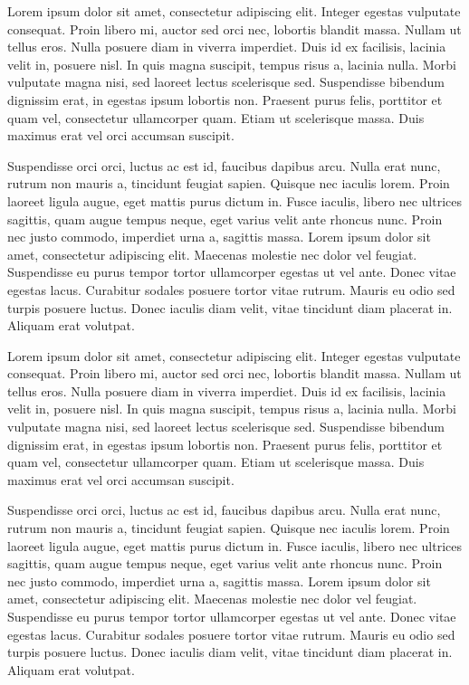 \documentclass[phd]{und-thesis}
\begin{document}



\appendix 


Lorem ipsum dolor sit amet, consectetur adipiscing elit. Integer egestas vulputate consequat. Proin libero mi, auctor sed orci nec, lobortis blandit massa. Nullam ut tellus eros. Nulla posuere diam in viverra imperdiet. Duis id ex facilisis, lacinia velit in, posuere nisl. In quis magna suscipit, tempus risus a, lacinia nulla. Morbi vulputate magna nisi, sed laoreet lectus scelerisque sed. Suspendisse bibendum dignissim erat, in egestas ipsum lobortis non. Praesent purus felis, porttitor et quam vel, consectetur ullamcorper quam. Etiam ut scelerisque massa. Duis maximus erat vel orci accumsan suscipit.

Suspendisse orci orci, luctus ac est id, faucibus dapibus arcu. Nulla erat nunc, rutrum non mauris a, tincidunt feugiat sapien. Quisque nec iaculis lorem. Proin laoreet ligula augue, eget mattis purus dictum in. Fusce iaculis, libero nec ultrices sagittis, quam augue tempus neque, eget varius velit ante rhoncus nunc. Proin nec justo commodo, imperdiet urna a, sagittis massa. Lorem ipsum dolor sit amet, consectetur adipiscing elit. Maecenas molestie nec dolor vel feugiat. Suspendisse eu purus tempor tortor ullamcorper egestas ut vel ante. Donec vitae egestas lacus. Curabitur sodales posuere tortor vitae rutrum. Mauris eu odio sed turpis posuere luctus. Donec iaculis diam velit, vitae tincidunt diam placerat in. Aliquam erat volutpat.


Lorem ipsum dolor sit amet, consectetur adipiscing elit. Integer egestas vulputate consequat. Proin libero mi, auctor sed orci nec, lobortis blandit massa. Nullam ut tellus eros. Nulla posuere diam in viverra imperdiet. Duis id ex facilisis, lacinia velit in, posuere nisl. In quis magna suscipit, tempus risus a, lacinia nulla. Morbi vulputate magna nisi, sed laoreet lectus scelerisque sed. Suspendisse bibendum dignissim erat, in egestas ipsum lobortis non. Praesent purus felis, porttitor et quam vel, consectetur ullamcorper quam. Etiam ut scelerisque massa. Duis maximus erat vel orci accumsan suscipit.

Suspendisse orci orci, luctus ac est id, faucibus dapibus arcu. Nulla erat nunc, rutrum non mauris a, tincidunt feugiat sapien. Quisque nec iaculis lorem. Proin laoreet ligula augue, eget mattis purus dictum in. Fusce iaculis, libero nec ultrices sagittis, quam augue tempus neque, eget varius velit ante rhoncus nunc. Proin nec justo commodo, imperdiet urna a, sagittis massa. Lorem ipsum dolor sit amet, consectetur adipiscing elit. Maecenas molestie nec dolor vel feugiat. Suspendisse eu purus tempor tortor ullamcorper egestas ut vel ante. Donec vitae egestas lacus. Curabitur sodales posuere tortor vitae rutrum. Mauris eu odio sed turpis posuere luctus. Donec iaculis diam velit, vitae tincidunt diam placerat in. Aliquam erat volutpat.
\end{document}
